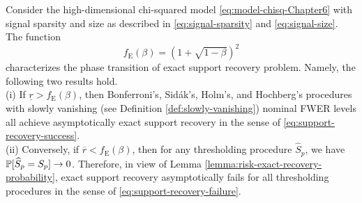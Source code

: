\begin{theorem} \label{thm:chi-squared-exact-boundary}
Consider the high-dimensional chi-squared model \eqref{eq:model-chisq-Chapter6} with signal sparsity and size as described in \eqref{eq:signal-sparsity} and \eqref{eq:signal-size}.
The function 
\begin{equation} \label{eq:exact-boundary-chisquared}
    f_{\mathrm{E}}(\beta) = \left(1 + \sqrt{1-\beta}\right)^2
\end{equation}
characterizes the phase transition of exact support recovery problem.
Namely, the following two results hold.\\

{\rm (i)} If $\underline{r} > f_{\mathrm{E}}(\beta)$, then Bonferroni's, Sid\'ak's, Holm's, and Hochberg's procedures with slowly vanishing (see Definition \ref{def:slowly-vanishing}) nominal FWER levels all achieve asymptotically exact support recovery in the sense of \eqref{eq:support-recovery-success}.\\

{\rm (ii)} Conversely, if $\overline{r} < f_{\mathrm{E}}(\beta)$, then for any thresholding procedure $\widehat{S}_p$, we have $\P[\widehat{S}_p=S_p]\to0$.
Therefore, in view of Lemma \ref{lemma:risk-exact-recovery-probability}, exact support recovery asymptotically fails for all thresholding procedures in the sense of \eqref{eq:support-recovery-failure}.
\end{theorem}



